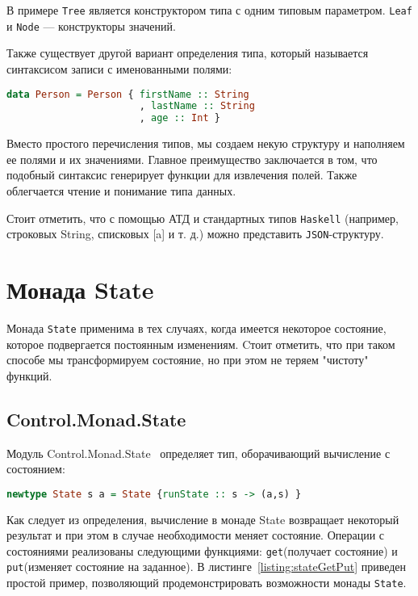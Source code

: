 В примере \lstinline{Tree} является конструктором типа с одним типовым параметром. \lstinline{Leaf} и \lstinline{Node} --- конструкторы значений. 

Также существует другой вариант определения типа, который называется синтаксисом записи с именованными полями:

\begin{lstlisting}[language=Haskell]
data Person = Person { firstName :: String
                       , lastName :: String
                       , age :: Int }
\end{lstlisting}

Вместо простого перечисления типов, мы создаем некую структуру и наполняем ее полями и их значениями. Главное преимущество заключается в том, что подобный синтаксис генерирует функции для извлечения полей. Также облегчается чтение и понимание типа данных. 

Стоит отметить, что с помощью АТД и стандартных типов \lstinline{Haskell} (например, строковых String, списковых [a] и т. д.) можно представить \lstinline{JSON}-структуру.
\section{Монада State}

Монада \lstinline{State} применима в тех случаях, когда имеется некоторое состояние, которое подвергается постоянным изменениям. Cтоит отметить, что при таком способе мы трансформируем состояние, но при этом не теряем "чистоту" \: функций. 

\subsection{Control.Monad.State}

Модуль Control.Monad.State~\cite{stateControl} определяет тип, оборачивающий вычисление с состоянием:

\begin{lstlisting}[language=Haskell]
newtype State s a = State {runState :: s -> (a,s) }
\end{lstlisting} 

Как следует из определения, вычисление в монаде State возвращает некоторый результат и при этом в случае необходимости меняет состояние. Операции с состояниями реализованы следующими функциями: \lstinline{get}\:(получает состояние) и \lstinline{put}\:(изменяет состояние на заданное). В листинге~\ref{listing:stateGetPut} приведен простой пример, позволяющий продемонстрировать возможности монады \lstinline{State}.

